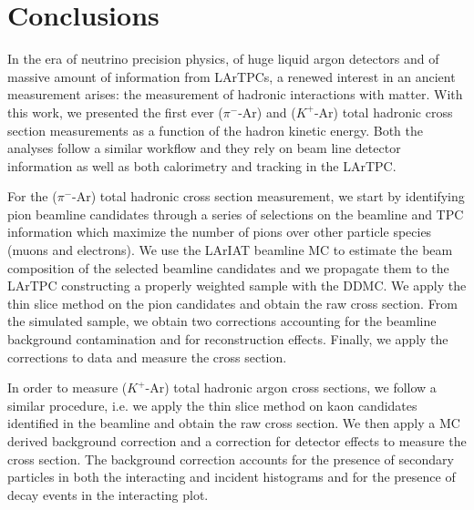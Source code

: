 \chapter{Conclusions}\label{ch:Conclusions}
In the era of neutrino precision physics, of huge liquid argon detectors and of massive amount of information from LArTPCs, a renewed interest in an ancient measurement arises: the measurement of hadronic interactions with matter. With this work, we presented the first ever ($\pi^-$-Ar) and ($K^+$-Ar) total hadronic cross section measurements as a function of the hadron kinetic energy. 
Both the analyses follow a similar workflow and  they rely on beam line detector information as well as both calorimetry and tracking in the LArTPC. 


For the ($\pi^-$-Ar) total hadronic cross section measurement, we start by identifying pion beamline candidates through a series of selections on the beamline and TPC information which maximize the number of pions over other particle species (muons and electrons). We use the LArIAT beamline MC to estimate the beam composition of the selected beamline candidates and we propagate them to the LArTPC constructing a properly weighted sample with the DDMC. We apply the thin slice method on the pion candidates and obtain the raw cross section. From the simulated sample, we obtain two corrections accounting for the beamline background contamination and for reconstruction effects. Finally, we apply the corrections to data and measure the cross section.

In order to measure ($K^+$-Ar) total hadronic  argon cross sections, we follow a similar procedure, i.e. we apply the thin slice method on kaon candidates identified in the beamline and obtain the raw cross section. We then apply a MC derived background correction and a correction for detector effects to measure the cross section. The background correction accounts for the presence of secondary particles in both the interacting and incident histograms and for the presence of decay events in the interacting plot.

